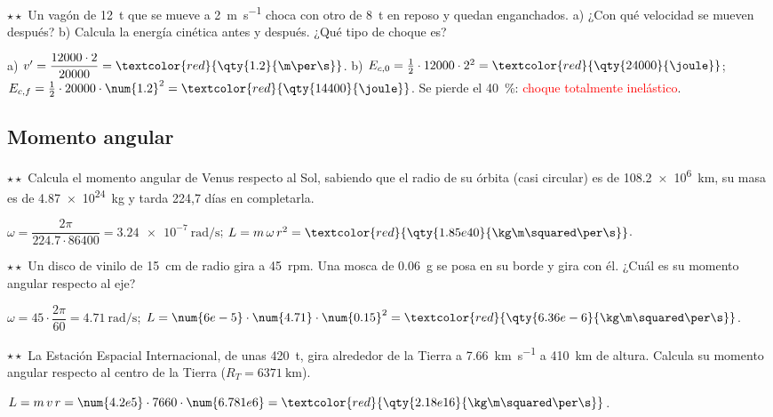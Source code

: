 \begin{exercise}
    \(\star\star\) Un vagón de \qty{12}{t} que se mueve a \qty{2}{\m\per\s} choca con otro de \qty{8}{t} en reposo y quedan
    enganchados. a) ¿Con qué velocidad se mueven después? b) Calcula la energía cinética antes y después. ¿Qué tipo de choque es?
    \begin{solu}
        a) \(v' = \dfrac{12000 \cdot 2}{20000} = \textcolor{red}{\qty{1.2}{\m\per\s}}\). b) \(E_{c,0} = \frac{1}{2} \cdot 12000 \cdot 2^2 =
        \textcolor{red}{\qty{24000}{\joule}}\); \(E_{c,f} = \frac{1}{2} \cdot 20000 \cdot \num{1.2}^2 = \textcolor{red}{\qty{14400}{\joule}}\).
        Se pierde el \qty{40}{\percent}: \textcolor{red}{choque totalmente inelástico}.
    \end{solu}
\end{exercise}

\subsection{Momento angular}

\begin{exercise}
    \(\star\star\) Calcula el momento angular de Venus respecto al Sol, sabiendo que el radio de su órbita (casi circular) es de
    \qty{108.2e6}{\km}, su masa es de \qty{4.87e24}{\kg} y tarda 224,7 días en completarla.
    \begin{solu}
        \(\omega = \dfrac{2\pi}{\num{224.7} \cdot 86400} = \qty{3.24e-7}{\radian\per\s}\); \(L = m\,\omega\,r^2 =
        \textcolor{red}{\qty{1.85e40}{\kg\m\squared\per\s}}\).
    \end{solu}
\end{exercise}

\begin{exercise}
    \(\star\star\) Un disco de vinilo de \qty{15}{\cm} de radio gira a \qty{45}{rpm}. Una mosca de \qty{0.06}{\g} se posa en su borde
    y gira con él. ¿Cuál es su momento angular respecto al eje?
    \begin{solu}
        \(\omega = 45 \cdot \dfrac{2\pi}{60} = \qty{4.71}{\radian\per\s}\); \(L = \num{6e-5} \cdot \num{4.71} \cdot \num{0.15}^2 =
        \textcolor{red}{\qty{6.36e-6}{\kg\m\squared\per\s}}\).
    \end{solu}
\end{exercise}

\begin{exercise}
    \(\star\star\) La Estación Espacial Internacional, de unas \qty{420}{t}, gira alrededor de la Tierra a \qty{7.66}{\km\per\s} a
    \qty{410}{\km} de altura. Calcula su momento angular respecto al centro de la Tierra (\(R_T = \qty{6371}{\km}\)).
    \begin{solu}
        \(L = m\,v\,r = \num{4.2e5} \cdot 7660 \cdot \num{6.781e6} = \textcolor{red}{\qty{2.18e16}{\kg\m\squared\per\s}}\).
    \end{solu}
\end{exercise}

